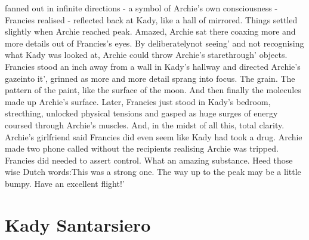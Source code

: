 \documentclass[12pt]{book}
\begin{document}
fanned out in infinite directions - a symbol of Archie's own consciousness - Francies realised - reflected back at Kady, like a hall of mirrored. Things settled slightly when Archie reached peak. Amazed, Archie sat there coaxing more and more details out of Francies's eyes. By deliberatelynot seeing' and not recognising what Kady was looked at, Archie could throw Archie's starethrough' objects. Francies stood an inch away from a wall in Kady's hallway and directed Archie's gazeinto it', grinned as more and more detail sprang into focus. The grain. The pattern of the paint, like the surface of the moon. And then finally the molecules made up Archie's surface. Later, Francies just stood in Kady's bedroom, strecthing, unlocked physical tensions and gasped as huge surges of energy coursed through Archie's muscles. And, in the midst of all this, total clarity. Archie's girlfriend said Francies did even seem like Kady had took a drug. Archie made two phone called without the recipients realising Archie was tripped. Francies did needed to assert control. What an amazing substance. Heed those wise Dutch words:This was a strong one. The way up to the peak may be a little bumpy. Have an excellent flight!'



\chapter{Kady Santarsiero}
\end{document}
